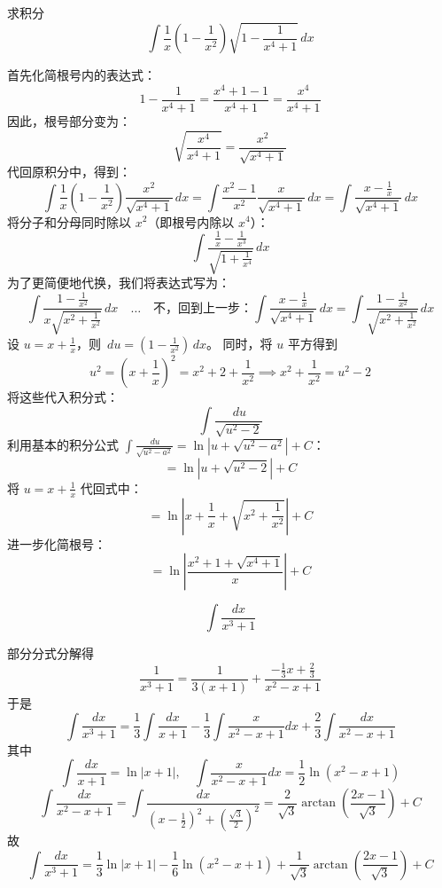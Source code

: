 \begin{questions}
\question
求积分
\[
\int \frac{1}{x} \left(1 - \frac{1}{x^2}\right) \sqrt{1 - \frac{1}{x^4 + 1}} \,dx
\]
\begin{solution}
首先化简根号内的表达式：
\[
1 - \frac{1}{x^4 + 1} = \frac{x^4 + 1 - 1}{x^4 + 1} = \frac{x^4}{x^4 + 1}
\]
因此，根号部分变为：
\[
\sqrt{\frac{x^4}{x^4 + 1}} = \frac{x^2}{\sqrt{x^4 + 1}}
\]
代回原积分中，得到：
\[
\int \frac{1}{x} \left(1 - \frac{1}{x^2}\right) \frac{x^2}{\sqrt{x^4 + 1}} \,dx = \int \frac{x^2 - 1}{x^2} \frac{x}{\sqrt{x^4 + 1}} \,dx = \int \frac{x - \frac{1}{x}}{\sqrt{x^4 + 1}} \,dx
\]
将分子和分母同时除以 $x^2$（即根号内除以 $x^4$）：
\[
\int \frac{\frac{1}{x} - \frac{1}{x^3}}{\sqrt{1 + \frac{1}{x^4}}} \,dx
\]
为了更简便地代换，我们将表达式写为：
\[
\int \frac{1 - \frac{1}{x^2}}{x\sqrt{x^2 + \frac{1}{x^2}}} \,dx \quad \dots \quad \text{不，回到上一步：} \int \frac{x - \frac{1}{x}}{\sqrt{x^4 + 1}} \,dx = \int \frac{1 - \frac{1}{x^2}}{\sqrt{x^2 + \frac{1}{x^2}}} \,dx
\]
设 $u = x + \frac{1}{x}$，则 $\,du = \left(1 - \frac{1}{x^2}\right) \,dx$。
同时，将 $u$ 平方得到
\[
u^2 = \left(x + \frac{1}{x}\right)^2 = x^2 + 2 + \frac{1}{x^2} \implies x^2 + \frac{1}{x^2} = u^2 - 2
\]
将这些代入积分式：
\[
\int \frac{\,du}{\sqrt{u^2 - 2}}
\]
利用基本的积分公式 $\int \frac{\,du}{\sqrt{u^2 - a^2}} = \ln\left|u + \sqrt{u^2 - a^2}\right| + C$：
\[
= \ln\left|u + \sqrt{u^2 - 2}\right| + C
\]
将 $u = x + \frac{1}{x}$ 代回式中：
\[
= \ln\left|x + \frac{1}{x} + \sqrt{x^2 + \frac{1}{x^2}}\right| + C
\]
进一步化简根号：
\[
= \ln\left|\frac{x^2 + 1 + \sqrt{x^4 + 1}}{x}\right| + C
\]
\end{solution}
    \question 
    \[
    \int \frac{dx}{x^3 + 1}
    \]
    \begin{solution}
        部分分式分解得
        \[
        \frac{1}{x^3 + 1}
        = \frac{1}{3(x + 1)} + \frac{-\frac{1}{3}x + \frac{2}{3}}{x^2 - x + 1}
        \]
        于是
        \[
        \int \frac{dx}{x^3 + 1}
        = \frac{1}{3} \int \frac{dx}{x + 1}
        - \frac{1}{3} \int \frac{x}{x^2 - x + 1} dx
        + \frac{2}{3} \int \frac{dx}{x^2 - x + 1}
        \]
        其中
        \[
        \int \frac{dx}{x + 1} = \ln|x + 1|,\quad
        \int \frac{x}{x^2 - x + 1} dx = \frac{1}{2} \ln(x^2 - x + 1)
        \]
        \[
        \int \frac{dx}{x^2 - x + 1}
        = \int \frac{dx}{\left(x - \frac{1}{2}\right)^2 + \left(\frac{\sqrt{3}}{2}\right)^2}
        = \frac{2}{\sqrt{3}} \arctan\left( \frac{2x - 1}{\sqrt{3}} \right) + C
        \]
        故
        \[
        \int \frac{dx}{x^3 + 1}
        = \frac{1}{3} \ln|x + 1|
        - \frac{1}{6} \ln(x^2 - x + 1)
        + \frac{1}{\sqrt{3}} \arctan\left( \frac{2x - 1}{\sqrt{3}} \right) + C
        \]
    \end{solution}


\end{questions}
